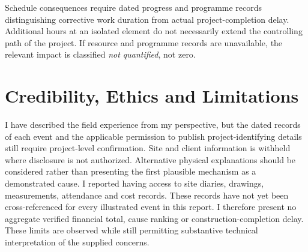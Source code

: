 Schedule consequences require dated progress and programme records distinguishing corrective work duration from actual project-completion delay. Additional hours at an isolated element do not necessarily extend the controlling path of the project. If resource and programme records are unavailable, the relevant impact is classified \emph{not quantified}, not zero.

\section{Credibility, Ethics and Limitations}
I have described the field experience from my perspective, but the dated records of each event and the applicable permission to publish project-identifying details still require project-level confirmation. Site and client information is withheld where disclosure is not authorized. Alternative physical explanations should be considered rather than presenting the first plausible mechanism as a demonstrated cause. I reported having access to site diaries, drawings, measurements, attendance and cost records. These records have not yet been cross-referenced for every illustrated event in this report. I therefore present no aggregate verified financial total, cause ranking or construction-completion delay. These limits are observed while still permitting substantive technical interpretation of the supplied concerns.
